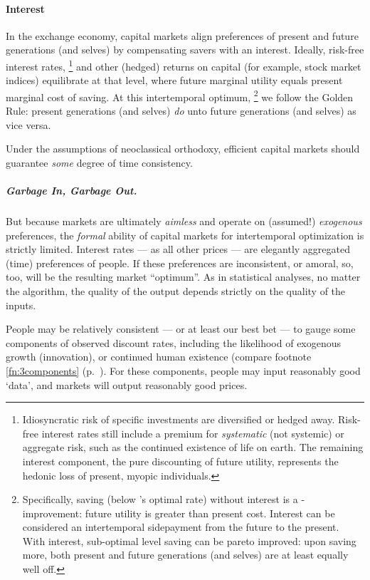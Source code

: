 \paragraph{Interest}  \label{sec:interest} In the exchange economy, capital markets align preferences of present and future generations (and selves) by compensating savers with an interest.
Ideally, risk-free interest rates,
\footnote{
	Idiosyncratic risk of specific investments are diversified or hedged away.
	Risk-free interest rates still include a premium for \emph{systematic} (not systemic) or aggregate risk, such as the continued existence of life on earth.
	The remaining interest component, the pure discounting of future utility, represents the hedonic loss of present, myopic individuals.
}
and other (hedged) returns on capital (for example, stock market indices) equilibrate at that level, where future marginal utility equals present marginal cost of saving.
At this intertemporal optimum,
\footnote{
	Specifically, saving (below \citeauthor{Solow1956}'s optimal rate) without interest is a \citeauthor{Kaldor1939}-\citeauthor{Hicks1939} improvement:
	future utility is greater than present cost.
	Interest can be considered an intertemporal sidepayment from the future to the present.
	With interest, sub-optimal level saving can be pareto improved:
	upon saving more, both present and future generations (and selves) are at least equally well off.
}
we follow the Golden Rule:
present generations (and selves) \emph{do} unto future generations (and selves) as vice versa.

Under the assumptions of neoclassical orthodoxy, efficient capital markets should guarantee \emph{some} degree of time consistency.

\subparagraph{Garbage In, Garbage Out.} But because markets are ultimately \emph{aimless} and operate on (assumed!) \emph{exogenous} preferences, the \emph{formal} ability of capital markets for intertemporal optimization is strictly limited.
Interest rates --- as all other prices --- are elegantly aggregated (time) preferences of people.
If these preferences are inconsistent, or amoral, so, too, will be the resulting market ``optimum''.
As in statistical analyses, no matter the algorithm, the quality of the output depends strictly on the quality of the inputs.

People may be relatively consistent --- or at least our best bet --- to gauge some components of observed discount rates, including the likelihood of exogenous growth (innovation), or continued human existence (compare footnote \ref{fn:3components} (p.~\pageref{fn:3components}).
For these components, people may input reasonably good `data', and markets will output reasonably good prices.

